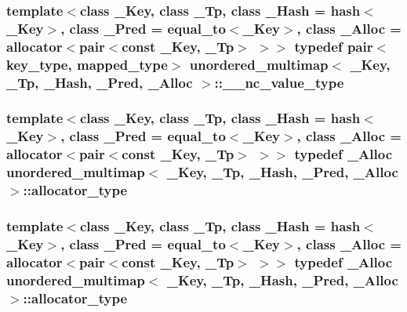 \subsubsection[{\+\_\+\+\_\+nc\+\_\+value\+\_\+type}]{\setlength{\rightskip}{0pt plus 5cm}template$<$class \+\_\+\+Key, class \+\_\+\+Tp, class \+\_\+\+Hash = hash$<$\+\_\+\+Key$>$, class \+\_\+\+Pred = equal\+\_\+to$<$\+\_\+\+Key$>$, class \+\_\+\+Alloc = allocator$<$pair$<$const \+\_\+\+Key, \+\_\+\+Tp$>$ $>$$>$ typedef pair$<${\bf key\+\_\+type}, {\bf mapped\+\_\+type}$>$ {\bf unordered\+\_\+multimap}$<$ \+\_\+\+Key, \+\_\+\+Tp, \+\_\+\+Hash, \+\_\+\+Pred, \+\_\+\+Alloc $>$\+::{\bf \+\_\+\+\_\+nc\+\_\+value\+\_\+type}}\label{classunordered__multimap_a02f7a45f9e19d7a13e361aa3509af744}
\hypertarget{classunordered__multimap_a821ff3be687cecd9ef325efa93759c19}{}
\subsubsection[{allocator\+\_\+type}]{\setlength{\rightskip}{0pt plus 5cm}template$<$class \+\_\+\+Key, class \+\_\+\+Tp, class \+\_\+\+Hash = hash$<$\+\_\+\+Key$>$, class \+\_\+\+Pred = equal\+\_\+to$<$\+\_\+\+Key$>$, class \+\_\+\+Alloc = allocator$<$pair$<$const \+\_\+\+Key, \+\_\+\+Tp$>$ $>$$>$ typedef \+\_\+\+Alloc {\bf unordered\+\_\+multimap}$<$ \+\_\+\+Key, \+\_\+\+Tp, \+\_\+\+Hash, \+\_\+\+Pred, \+\_\+\+Alloc $>$\+::{\bf allocator\+\_\+type}}\label{classunordered__multimap_a821ff3be687cecd9ef325efa93759c19}
\hypertarget{classunordered__multimap_a821ff3be687cecd9ef325efa93759c19}{}
\subsubsection[{allocator\+\_\+type}]{\setlength{\rightskip}{0pt plus 5cm}template$<$class \+\_\+\+Key, class \+\_\+\+Tp, class \+\_\+\+Hash = hash$<$\+\_\+\+Key$>$, class \+\_\+\+Pred = equal\+\_\+to$<$\+\_\+\+Key$>$, class \+\_\+\+Alloc = allocator$<$pair$<$const \+\_\+\+Key, \+\_\+\+Tp$>$ $>$$>$ typedef \+\_\+\+Alloc {\bf unordered\+\_\+multimap}$<$ \+\_\+\+Key, \+\_\+\+Tp, \+\_\+\+Hash, \+\_\+\+Pred, \+\_\+\+Alloc $>$\+::{\bf allocator\+\_\+type}}\label{classunordered__multimap_a821ff3be687cecd9ef325efa93759c19}
\hypertarget{classunordered__multimap_a3cb373bd19680f9933781c04905fde39}{}
